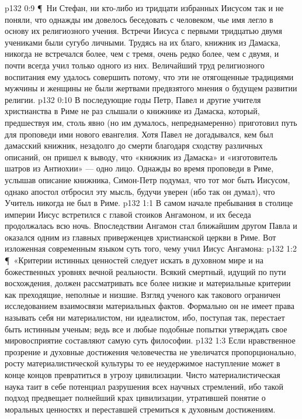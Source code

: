 \vs p132 0:9 \P\ Ни Стефан, ни кто\hyp{}либо из тридцати избранных Иисусом так и не поняли, что однажды им довелось беседовать с человеком, чье имя легло в основу их религиозного учения. Встречи Иисуса с первыми тридцатью двумя учениками были сугубо личными. Трудясь на их благо, книжник из Дамаска, никогда не встречался более, чем с тремя, очень редко более, чем с двумя, и почти всегда учил только одного из них. Величайший труд религиозного воспитания ему удалось совершить потому, что эти не отягощенные традициями мужчины и женщины не были жертвами предвзятого мнения о будущем развитии религии.
\vs p132 0:10 В последующие годы Петр, Павел и другие учителя христианства в Риме не раз слышали о книжнике из Дамаска, который, предшествуя им, столь явно (но им думалось, непреднамеренно) приготовил путь для проповеди ими нового евангелия. Хотя Павел не догадывался, кем был дамасский книжник, незадолго до смерти благодаря сходству различных описаний, он пришел к выводу, что «книжник из Дамаска» и «изготовитель шатров из Антиохии» --- одно лицо. Однажды во время проповеди в Риме, услышав описание книжника, Симон\hyp{}Петр подумал, что тот мог быть Иисусом, однако апостол отбросил эту мысль, будучи уверен (ибо так он думал), что Учитель никогда не был в Риме.
\vs p132 1:1 В самом начале пребывания в столице империи Иисус встретился с главой стоиков Ангамоном, и их беседа продолжалась всю ночь. Впоследствии Ангамон стал ближайшим другом Павла и оказался одним из главных приверженцев христианской церкви в Риме. Вот изложенная современным языком суть того, чему учил Иисус Ангамона:
\vs p132 1:2 \P\ «Критерии истинных ценностей следует искать в духовном мире и на божественных уровнях вечной реальности. Всякий смертный, идущий по пути восхождения, должен рассматривать все более низкие и материальные критерии как преходящие, неполные и низшие. Взгляд ученого как такового ограничен исследованием взаимосвязи материальных фактов. Формально он не имеет права называть себя ни материалистом, ни идеалистом, ибо, поступая так, перестает быть истинным ученым; ведь все и любые подобные попытки утверждать свое мировосприятие составляют самую суть философии.
\vs p132 1:3 Если нравственное прозрение и духовные достижения человечества не увеличатся пропорционально, росту материалистической культуры то ее неудержимое наступление может в конце концов превратиться в угрозу цивилизации. Чисто материалистическая наука таит в себе потенциал разрушения всех научных стремлений, ибо такой подход предвещает полнейший крах цивилизации, утратившей понятие о моральных ценностях и переставшей стремиться к духовным достижениям.
